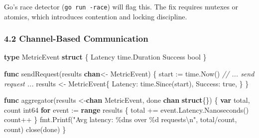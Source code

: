 \documentclass[
]{article}
\newenvironment{Shaded}{}{}
\newcommand{\BuiltInTok}[1]{\textcolor[rgb]{0.00,0.50,0.00}{#1}}
\newcommand{\CharTok}[1]{\textcolor[rgb]{0.25,0.44,0.63}{#1}}
\newcommand{\CommentTok}[1]{\textcolor[rgb]{0.38,0.63,0.69}{\textit{#1}}}
\newcommand{\ControlFlowTok}[1]{\textcolor[rgb]{0.00,0.44,0.13}{\textbf{#1}}}
\newcommand{\DataTypeTok}[1]{\textcolor[rgb]{0.56,0.13,0.00}{#1}}
\newcommand{\KeywordTok}[1]{\textcolor[rgb]{0.00,0.44,0.13}{\textbf{#1}}}
\newcommand{\NormalTok}[1]{#1}
\newcommand{\OperatorTok}[1]{\textcolor[rgb]{0.40,0.40,0.40}{#1}}
\newcommand{\OtherTok}[1]{\textcolor[rgb]{0.00,0.44,0.13}{#1}}
\newcommand{\StringTok}[1]{\textcolor[rgb]{0.25,0.44,0.63}{#1}}
\begin{document}
Go's race detector (\texttt{go\ run\ -race}) will flag this. The fix
requires mutexes or atomics, which introduces contention and locking
discipline.

\hypertarget{channel-based-communication}{%
\subsubsection{4.2 Channel-Based
Communication}\label{channel-based-communication}}

\begin{Shaded}
\begin{Highlighting}[]
\KeywordTok{type}\NormalTok{ MetricEvent }\KeywordTok{struct} \OperatorTok{\{}
\NormalTok{    Latency time}\OperatorTok{.}\NormalTok{Duration}
\NormalTok{    Success }\DataTypeTok{bool}
\OperatorTok{\}}

\KeywordTok{func}\NormalTok{ sendRequest}\OperatorTok{(}\NormalTok{results }\KeywordTok{chan}\OperatorTok{\textless{}{-}}\NormalTok{ MetricEvent}\OperatorTok{)} \OperatorTok{\{}
\NormalTok{    start }\OperatorTok{:=}\NormalTok{ time}\OperatorTok{.}\NormalTok{Now}\OperatorTok{()}
    \CommentTok{// ... send request ...}
\NormalTok{    results }\OperatorTok{\textless{}{-}}\NormalTok{ MetricEvent}\OperatorTok{\{}
\NormalTok{        Latency}\OperatorTok{:}\NormalTok{ time}\OperatorTok{.}\NormalTok{Since}\OperatorTok{(}\NormalTok{start}\OperatorTok{),}
\NormalTok{        Success}\OperatorTok{:} \OtherTok{true}\OperatorTok{,}
    \OperatorTok{\}}
\OperatorTok{\}}

\KeywordTok{func}\NormalTok{ aggregator}\OperatorTok{(}\NormalTok{results }\OperatorTok{\textless{}{-}}\KeywordTok{chan}\NormalTok{ MetricEvent}\OperatorTok{,}\NormalTok{ done }\KeywordTok{chan} \KeywordTok{struct}\OperatorTok{\{\})} \OperatorTok{\{}
    \KeywordTok{var}\NormalTok{ total}\OperatorTok{,}\NormalTok{ count }\DataTypeTok{int64}
    \ControlFlowTok{for}\NormalTok{ event }\OperatorTok{:=} \KeywordTok{range}\NormalTok{ results }\OperatorTok{\{}
\NormalTok{        total }\OperatorTok{+=}\NormalTok{ event}\OperatorTok{.}\NormalTok{Latency}\OperatorTok{.}\NormalTok{Nanoseconds}\OperatorTok{()}
\NormalTok{        count}\OperatorTok{++}
    \OperatorTok{\}}
\NormalTok{    fmt}\OperatorTok{.}\NormalTok{Printf}\OperatorTok{(}\StringTok{"Avg latency: \%dns over \%d requests}\CharTok{\textbackslash{}n}\StringTok{"}\OperatorTok{,}\NormalTok{ total}\OperatorTok{/}\NormalTok{count}\OperatorTok{,}\NormalTok{ count}\OperatorTok{)}
    \BuiltInTok{close}\OperatorTok{(}\NormalTok{done}\OperatorTok{)}
\OperatorTok{\}}


\end{Highlighting}
\end{Shaded}
\end{document}

